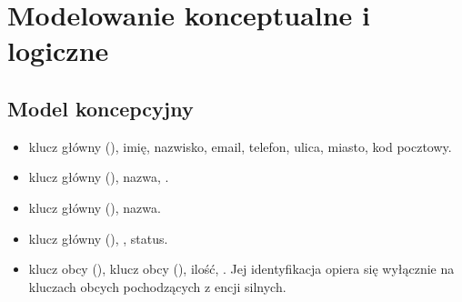 \documentclass[a4paper,11pt,english,openany,oneside]{sphinxmanual}
\begin{document}
\section{Modelowanie konceptualne i logiczne}
\label{\detokenize{rozdzial_3/index:modelowanie-konceptualne-i-logiczne}}

\subsection{Model koncepcyjny}
\label{\detokenize{rozdzial_3/index:model-koncepcyjny}}
\sphinxAtStartPar
{}
\begin{itemize}
\item {} 
\sphinxAtStartPar
{} klucz główny (), imię, nazwisko, e\sphinxhyphen{}mail, telefon, ulica, miasto, kod pocztowy.

\item {} 
\sphinxAtStartPar
{} klucz główny (), nazwa, .

\item {} 
\sphinxAtStartPar
{} klucz główny (), nazwa.

\item {} 
\sphinxAtStartPar
{} klucz główny (), , status.

\end{itemize}

\sphinxAtStartPar
{}
\begin{itemize}
\item {} 
\sphinxAtStartPar
{} klucz obcy (), klucz obcy (), ilość, . Jej identyfikacja opiera się wyłącznie na kluczach obcych pochodzących z encji silnych.

\end{itemize}

\sphinxAtStartPar
{}
\end{document}
